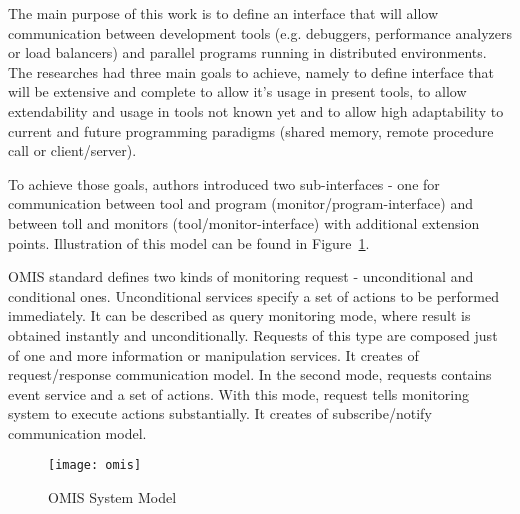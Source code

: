 The main purpose of this work is to define an interface that will allow communication between development tools (e.g. debuggers, performance analyzers or load balancers) and parallel programs running in distributed environments. The researches had three main goals to achieve, namely to define interface that will be extensive and complete to allow it\rq{}s usage in present tools, to allow extendability and usage in tools not known yet and to allow high adaptability to current and future programming paradigms (shared memory, remote procedure call or client/server).

To achieve those goals, authors introduced two sub-interfaces - one for communication between tool and program (monitor/program-interface) and between toll and monitors (tool/monitor-interface) with additional extension points. Illustration of this model can be found in Figure~\ref{fig:omis}. 

OMIS standard defines two kinds of monitoring request - unconditional and conditional ones. Unconditional services specify a set of actions to be performed immediately. It can be described as query monitoring mode, where result is obtained instantly and unconditionally. Requests of this type are composed just of one and more information or manipulation services. It creates of request/response communication model. In the second mode, requests contains event service and a set of actions. With this mode, request tells monitoring system to execute actions substantially. It creates of subscribe/notify communication model.


\begin{figure}[ht]
  \centering
  \texttt{[image: omis]}
  \caption{OMIS System Model}
  \label{fig:omis}
\end{figure}
  
      

